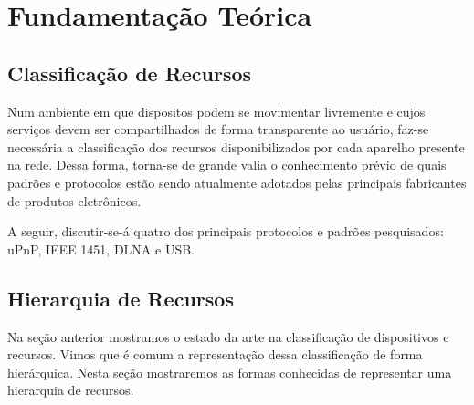 \chapter{Fundamentação Teórica}

\section{Classificação de Recursos}

Num ambiente em que dispositos podem se movimentar livremente e cujos serviços devem ser compartilhados de forma transparente ao usuário, faz-se necessária a classificação dos recursos disponibilizados por cada aparelho presente na rede. Dessa forma, torna-se de grande valia o conhecimento prévio de quais padrões e protocolos estão sendo atualmente adotados pelas principais fabricantes de produtos eletrônicos.

A seguir, discutir-se-á quatro dos principais protocolos e padrões pesquisados: uPnP, IEEE 1451, DLNA e USB.

\begin{comment}
Existem diferentes formas de fazer uma classificação para dispositivos ou recursos.
Nesta seção falaremos sobre algumas tecnologias que fazem uso de uma classificação de dispositivos para auxiliar a comunicação entre eles e o desenvolvimento de aplicações para estes dispositivos.
\end{comment}






\section{Hierarquia de Recursos}
Na seção anterior mostramos o estado da arte na classificação de dispositivos e recursos. Vimos que é comum a representação dessa classificação de forma hierárquica. Nesta seção mostraremos as formas conhecidas de representar uma hierarquia de recursos.



